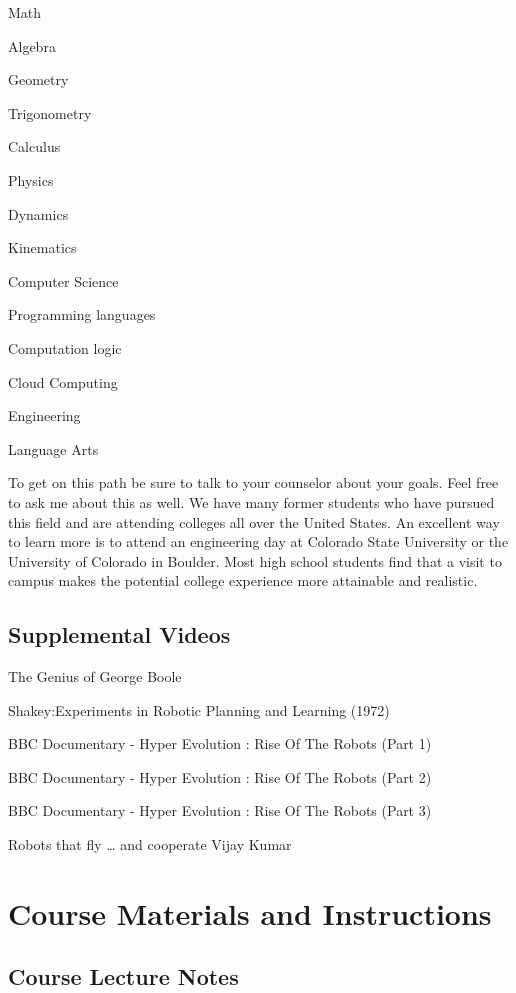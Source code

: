 \documentclass[
]{book}
\begin{document}
Math

Algebra

Geometry

Trigonometry

Calculus

Physics

Dynamics

Kinematics

Computer Science

Programming languages

Computation logic

Cloud Computing

Engineering

Language Arts

To get on this path be sure to talk to your counselor about your goals. Feel free to ask me about this as well. We have many former students who have pursued this field and are attending colleges all over the United States. An excellent way to learn more is to attend an engineering day at Colorado State University or the University of Colorado in Boulder. Most high school students find that a visit to campus makes the potential college experience more attainable and realistic.

\hypertarget{supplemental-videos}{%
\section{Supplemental Videos}\label{supplemental-videos}}

The Genius of George Boole

Shakey:Experiments in Robotic Planning and Learning (1972)

BBC Documentary - Hyper Evolution : Rise Of The Robots (Part 1)

BBC Documentary - Hyper Evolution : Rise Of The Robots (Part 2)

BBC Documentary - Hyper Evolution : Rise Of The Robots (Part 3)

Robots that fly \ldots{} and cooperate \textbar{} Vijay Kumar

\hypertarget{course-materials-and-instructions}{%
\chapter{Course Materials and Instructions}\label{course-materials-and-instructions}}

\hypertarget{course-lecture-notes}{%
\section{Course Lecture Notes}\label{course-lecture-notes}}
\end{document}
